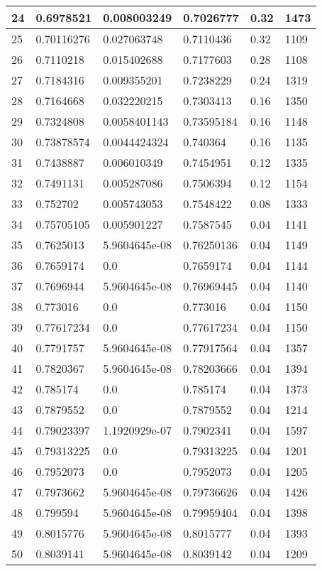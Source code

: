 \begin{longtable}{|l|l|l|l|l|l|}
24 & 0.6978521 & 0.008003249 & 0.7026777 & 0.32 & 1473 \\ \hline 
25 & 0.70116276 & 0.027063748 & 0.7110436 & 0.32 & 1109 \\ \hline 
26 & 0.7110218 & 0.015402688 & 0.7177603 & 0.28 & 1108 \\ \hline 
27 & 0.7184316 & 0.009355201 & 0.7238229 & 0.24 & 1319 \\ \hline 
28 & 0.7164668 & 0.032220215 & 0.7303413 & 0.16 & 1350 \\ \hline 
29 & 0.7324808 & 0.0058401143 & 0.73595184 & 0.16 & 1148 \\ \hline 
30 & 0.73878574 & 0.0044424324 & 0.740364 & 0.16 & 1135 \\ \hline 
31 & 0.7438887 & 0.006010349 & 0.7454951 & 0.12 & 1335 \\ \hline 
32 & 0.7491131 & 0.005287086 & 0.7506394 & 0.12 & 1154 \\ \hline 
33 & 0.752702 & 0.005743053 & 0.7548422 & 0.08 & 1333 \\ \hline 
34 & 0.75705105 & 0.005901227 & 0.7587545 & 0.04 & 1141 \\ \hline 
35 & 0.7625013 & 5.9604645e-08 & 0.76250136 & 0.04 & 1149 \\ \hline 
36 & 0.7659174 & 0.0 & 0.7659174 & 0.04 & 1144 \\ \hline 
37 & 0.7696944 & 5.9604645e-08 & 0.76969445 & 0.04 & 1140 \\ \hline 
38 & 0.773016 & 0.0 & 0.773016 & 0.04 & 1150 \\ \hline 
39 & 0.77617234 & 0.0 & 0.77617234 & 0.04 & 1150 \\ \hline 
40 & 0.7791757 & 5.9604645e-08 & 0.77917564 & 0.04 & 1357 \\ \hline 
41 & 0.7820367 & 5.9604645e-08 & 0.78203666 & 0.04 & 1394 \\ \hline 
42 & 0.785174 & 0.0 & 0.785174 & 0.04 & 1373 \\ \hline 
43 & 0.7879552 & 0.0 & 0.7879552 & 0.04 & 1214 \\ \hline 
44 & 0.79023397 & 1.1920929e-07 & 0.7902341 & 0.04 & 1597 \\ \hline 
45 & 0.79313225 & 0.0 & 0.79313225 & 0.04 & 1201 \\ \hline 
46 & 0.7952073 & 0.0 & 0.7952073 & 0.04 & 1205 \\ \hline 
47 & 0.7973662 & 5.9604645e-08 & 0.79736626 & 0.04 & 1426 \\ \hline 
48 & 0.799594 & 5.9604645e-08 & 0.79959404 & 0.04 & 1398 \\ \hline 
49 & 0.8015776 & 5.9604645e-08 & 0.8015777 & 0.04 & 1393 \\ \hline 
50 & 0.8039141 & 5.9604645e-08 & 0.8039142 & 0.04 & 1209 \\ \hline 
\end{longtable}
